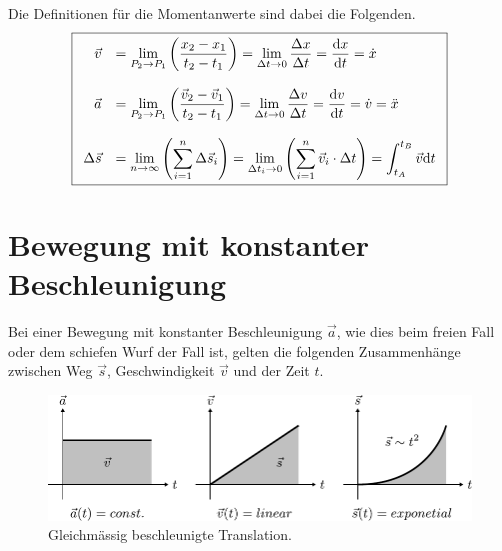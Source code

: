 \noindent
Die Definitionen für die Momentanwerte sind dabei die Folgenden.
\[\boxed{\begin{array}{r l}
	\vec{v}	&
		= \displaystyle \lim\limits_{P_2 \rightarrow P_1} 
			{\left( \frac{x_2 - x_1}{t_2 - t_1} \right)}
		= \displaystyle \lim\limits_{\Delta t \rightarrow 0}
			{\frac{\Delta x}{\Delta t}}
		= \displaystyle \frac{\mathrm{d}x}{\mathrm{d}t}=\dot{x} \\
	& \\
	\vec{a} &
		= \displaystyle \lim\limits_{P_2 \rightarrow P_1}
			{\left( \frac{\vec{v}_2 
			- \vec{v}_1}{t_2 - t_1} \right)}
		= \displaystyle \lim\limits_{\Delta t \rightarrow 0}
			{\frac{\Delta v}{\Delta t}}
		= \displaystyle \frac{\mathrm{d}v}{\mathrm{d}t}
		= \displaystyle \dot{v}
		= \ddot{x} \\
	& \\
	\Delta \vec{s} &
		= \displaystyle \lim\limits_{n \rightarrow \infty}
			{\left( \sum_{i=1}^{n} \Delta \vec{s}_i \right)}
		= \displaystyle \lim\limits_{\Delta t_i \rightarrow 0}
			{\left(
				\sum^{n}_{i=1}\vec{v}_i\cdot\Delta t
			\right)}
		= \displaystyle \int_{t_A}^{t_B}\vec{v}\mathrm{d}t
\end{array}}\]

\section{Bewegung mit konstanter Beschleunigung}
Bei einer Bewegung mit konstanter Beschleunigung $\vec{a}$, wie dies beim
freien Fall oder dem schiefen Wurf der Fall ist, gelten die folgenden
Zusammenhänge zwischen Weg $\vec{s}$, Geschwindigkeit $\vec{v}$ und 
der Zeit $t$.

\begin{figure}[h!]
	\centering
	\includegraphics[scale=0.7]{bewegung.pdf}
	\caption{Gleichmässig beschleunigte Translation.}
	\label{fig:bewegung}
\end{figure}


